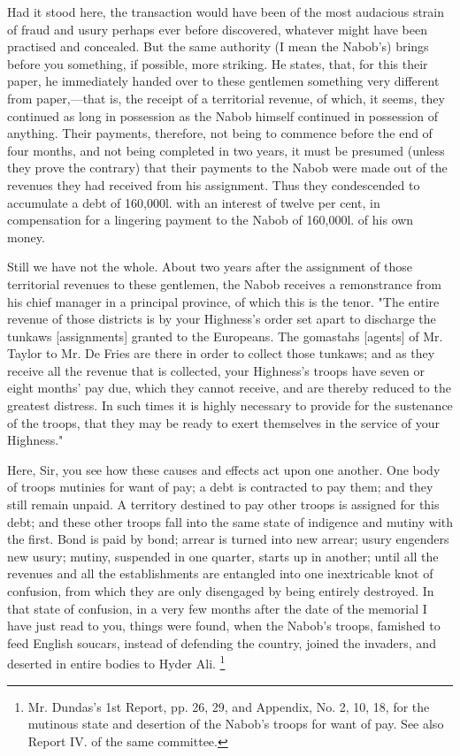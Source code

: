 Had it stood here, the transaction would have been of the most audacious strain of fraud and usury perhaps ever before discovered, whatever might have been practised and concealed. But the same authority (I mean the Nabob's) brings before you something, if possible, more striking. He states, that, for this their paper, he immediately handed over to these gentlemen something very different from paper,—that is, the receipt of a territorial revenue, of which, it seems, they continued as long in possession as the Nabob himself continued in possession of anything. Their payments, therefore, not being to commence before the end of four months, and not being completed in two years, it must be presumed (unless they prove the contrary) that their payments to the Nabob were made out of the revenues they had received from his assignment. Thus they condescended to accumulate a debt of 160,000l. with an interest of twelve per cent, in compensation for a lingering payment to the Nabob of 160,000l. of his own money.

Still we have not the whole. About two years after the assignment of those territorial revenues to these gentlemen, the Nabob receives a remonstrance from his chief manager in a principal province, of which this is the tenor. "The entire revenue of those districts is by your Highness's order set apart to discharge the tunkaws [assignments] granted to the Europeans. The gomastahs [agents] of Mr. Taylor to Mr. De Fries are there in order to collect those tunkaws; and as they receive all the revenue that is collected, your Highness's troops have seven or eight months' pay due, which they cannot receive, and are thereby reduced to the greatest distress. In such times it is highly necessary to provide for the sustenance of the troops, that they may be ready to exert themselves in the service of your Highness."

Here, Sir, you see how these causes and effects act upon one another. One body of troops mutinies for want of pay; a debt is contracted to pay them; and they still remain unpaid. A territory destined to pay other troops is assigned for this debt; and these other troops fall into the same state of indigence and mutiny with the first. Bond is paid by bond; arrear is turned into new arrear; usury engenders new usury; mutiny, suspended in one quarter, starts up in another; until all the revenues and all the establishments are entangled into one inextricable knot of confusion, from which they are only disengaged by being entirely destroyed. In that state of confusion, in a very few months after the date of the memorial I have just read to you, things were found, when the Nabob's troops, famished to feed English soucars, instead of defending the country, joined the invaders, and deserted in entire bodies to Hyder Ali.
\footnote{ Mr. Dundas's 1st Report, pp. 26, 29, and Appendix, No. 2, 10, 18, for the mutinous state and desertion of the Nabob's troops for want of pay. See also Report IV. of the same committee.}


